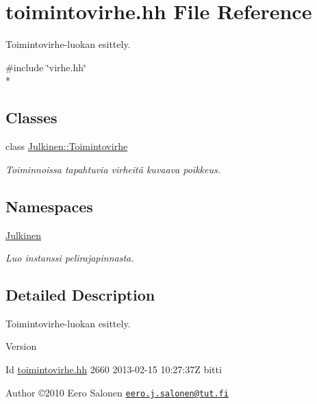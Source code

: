 \hypertarget{toimintovirhe_8hh}{}\section{toimintovirhe.\+hh File Reference}
\label{toimintovirhe_8hh}


Toimintovirhe-\/luokan esittely.  


{\ttfamily \#include \char`\"{}virhe.\+hh\char`\"{}}\\*
\subsection*{Classes}
\begin{DoxyCompactItemize}
\item 
class \hyperlink{class_julkinen_1_1_toimintovirhe}{Julkinen\+::\+Toimintovirhe}
\begin{DoxyCompactList}\small\item\em Toiminnoissa tapahtuvia virheitä kuvaava poikkeus. \end{DoxyCompactList}\end{DoxyCompactItemize}
\subsection*{Namespaces}
\begin{DoxyCompactItemize}
\item 
 \hyperlink{namespace_julkinen}{Julkinen}
\begin{DoxyCompactList}\small\item\em Luo instanssi pelirajapinnasta. \end{DoxyCompactList}\end{DoxyCompactItemize}


\subsection{Detailed Description}
Toimintovirhe-\/luokan esittely. 

\begin{DoxyVersion}{Version}

\end{DoxyVersion}
\begin{DoxyParagraph}{Id}
\hyperlink{toimintovirhe_8hh}{toimintovirhe.\+hh} 2660 2013-\/02-\/15 10\+:27\+:37\+Z bitti 
\end{DoxyParagraph}


\begin{DoxyAuthor}{Author}
©2010 Eero Salonen \href{mailto:eero.j.salonen@tut.fi}{\tt eero.\+j.\+salonen@tut.\+fi} 
\end{DoxyAuthor}
